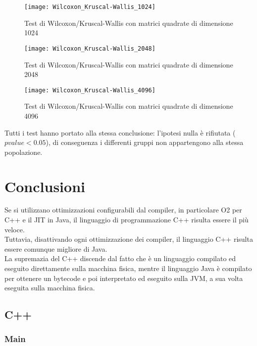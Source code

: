 \begin{figure}[!htbp]
  \texttt{[image: Wilcoxon\_Kruscal-Wallis\_1024]}
  \caption{Test di Wilcoxon/Kruscal-Wallis con matrici quadrate di dimensione 1024}
  \label{Wilcoxon_Kruscal-Wallis_1024}
\end{figure}

\clearpage

\begin{figure}[!htbp]
  \texttt{[image: Wilcoxon\_Kruscal-Wallis\_2048]}
  \caption{Test di Wilcoxon/Kruscal-Wallis con matrici quadrate di dimensione 2048}
  \label{Wilcoxon_Kruscal-Wallis_2048}
\end{figure}

\clearpage

\begin{figure}[!htbp]
  \texttt{[image: Wilcoxon\_Kruscal-Wallis\_4096]}
  \caption{Test di Wilcoxon/Kruscal-Wallis con matrici quadrate di dimensione 4096}
  \label{Wilcoxon_Kruscal-Wallis_4096}
\end{figure}

Tutti i test hanno portato alla stessa conclusione: l'ipotesi nulla è
rifiutata ($pvalue < 0.05$), di conseguenza i differenti gruppi non appartengono
alla stessa popolazione.\\

\clearpage

\section{Conclusioni}
Se si utilizzano ottimizzazioni configurabili dal compiler, in particolare O2
per C++ e il JIT in Java, il linguaggio di programmazione C++ risulta essere il
più veloce.\\
Tuttavia, disattivando ogni ottimizzazione dei compiler, il linguaggio C++
risulta essere comunque migliore di Java.\\
La supremazia del C++ discende dal fatto che è un linguaggio compilato ed
eseguito direttamente sulla macchina fisica, mentre il linguaggio Java è compilato
per ottenere un bytecode e poi interpretato ed eseguito sulla JVM, a sua volta
eseguita sulla macchina fisica.

\subsection{C++}
\subsubsection{Main}


